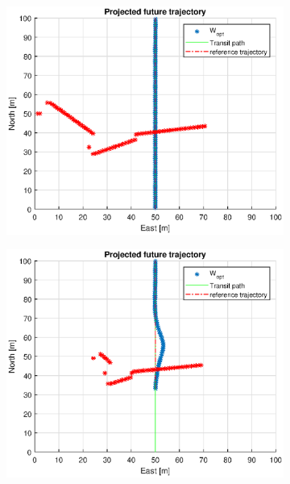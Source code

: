 \begin{figure} %
    \begin{subfigure}[b]{0.49\textwidth}
        \centering
        \includegraphics[width=\textwidth]{Images/Figures/Enkel_SO/Simple0_f999_Frame1}
    \end{subfigure}
    \hfill
    \begin{subfigure}[b]{0.499\textwidth}
        \centering
        \includegraphics[width=\textwidth]{Images/Figures/Enkel_SO/Simple0_f999_Frame2}

\end{subfigure}
\end{figure}
